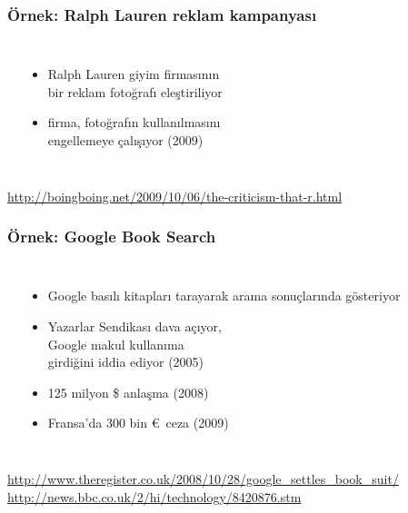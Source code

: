 \documentclass[dvipsnames]{beamer}
\theoremstyle{definition}
\theoremstyle{example}
\theoremstyle{plain}
\begin{document}
\begin{frame}
  \frametitle{Örnek: Ralph Lauren reklam kampanyası}

  \begin{columns}
    \begin{center}
    \end{center}

    \begin{itemize}
      \item Ralph Lauren giyim firmasının\\
        bir reklam fotoğrafı eleştiriliyor
      \item firma, fotoğrafın kullanılmasını\\
        engellemeye çalışıyor (2009)
    \end{itemize}
  \end{columns}

  \medskip
  \tiny{\url{http://boingboing.net/2009/10/06/the-criticism-that-r.html}}\\
\end{frame}

\begin{frame}
  \frametitle{Örnek: Google Book Search}

  \begin{columns}
    \begin{center}
    \end{center}

    \begin{itemize}
      \item Google basılı kitapları tarayarak arama sonuçlarında gösteriyor
      \item Yazarlar Sendikası dava açıyor,\\
        Google makul kullanıma\\
        girdiğini iddia ediyor (2005)
      \item 125 milyon \$ anlaşma (2008)
      \item Fransa'da 300 bin \euro~ceza (2009)
    \end{itemize}
  \end{columns}

  \medskip
  \tiny{\url{http://www.theregister.co.uk/2008/10/28/google_settles_book_suit/}}\\
  \tiny{\url{http://news.bbc.co.uk/2/hi/technology/8420876.stm}}\\
\end{frame}
\end{document}
